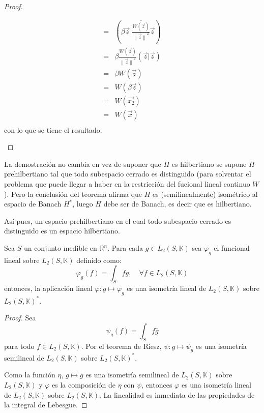 \documentclass[12pt]{report}
\theoremstyle{largebreak}
\newcommand\norm[1]{\ensuremath{\|#1\|}}
\newcommand\pint[2]{\ensuremath{\left(#1\big| #2\right)}}
\newcommand\conj[1]{\ensuremath{\overline{#1}}}
\begin{document}
\begin{proof}
\begin{enumerate}
\begin{equation*}
\begin{split}
                    =&\pint{\beta\vec{z}}{\conj{\frac{W(\vec{z})}{\norm{\vec{z}}^2}}\vec{z}} \\
                    =&\beta\frac{W(\vec{z})}{\norm{\vec{z}}^2}\pint{\vec{z}}{\vec{z}} \\
                    =&\beta W(\vec{z}) \\
                    =&W(\beta\vec{z}) \\
                    =&W(\vec{x_2}) \\
                    =&W(\vec{x}) \\
                \end{split}
            \end{equation*}
            con lo que se tiene el resultado.

        \end{enumerate}
    \end{proof}

    \begin{obs}
        La demostración no cambia en vez de suponer que $H$ es hilbertiano se supone $H$ prehilbertiano tal que todo subespacio cerrado es distinguido (para solventar el problema que puede llegar a haber en la restricción del fucional lineal continuo $W$). Pero la conclusión del teorema afirma que $H$ es (semilinealmente) isométrico al espacio de Banach $H^*$, luego $H$ debe ser de Banach, es decir que es hilbertiano.

        Así pues, un espacio prehilbertiano en el cual todo subespacio cerrado es distinguido es un espacio hilbertiano. 
    \end{obs}

    \begin{propo}[Autodualidad de $L_2$]
        Sea $S$ un conjunto medible en $\mathbb{R}^n$. Para cada $g\in L_2(S,\mathbb{K})$ sea $\varphi_g$ el funcional lineal sobre $L_2(S,\mathbb{K})$ definido como:
        \begin{equation*}
            \varphi_g(f)=\int_Sfg, \quad\forall f\in L_2(S,\mathbb{K})
        \end{equation*}
        entonces, la aplicación lineal $\varphi:g\mapsto \varphi_g$ es una isometría lineal de $L_2(S,\mathbb{K})$ sobre $L_2(S,\mathbb{K})^*$.
    \end{propo}

    \begin{proof}
        Sea $$\psi_g(f)=\int_S f\conj{g}$$ para todo $f\in L_2(S,\mathbb{K})$. Por el teorema de Riesz, $\psi:g\mapsto\psi_g$ es una isometría semilineal de $L_2(S,\mathbb{K})$ sobre $L_2(S,\mathbb{K})^*$.

        Como la función $\eta$, $g\mapsto\conj{g}$ es una isometría semilineal de $L_2(S,\mathbb{K})$ sobre $L_2(S,\mathbb{K})$ y $\varphi$ es la composición de $\eta$ con $\psi$, entonces $\varphi$ es una isometría lineal de $L_2(S,\mathbb{K})$ sobre $L_2(S,\mathbb{K})$. La linealidad es inmediata de las propiedades de la integral de Lebesgue.

    \end{proof}
\end{document}
